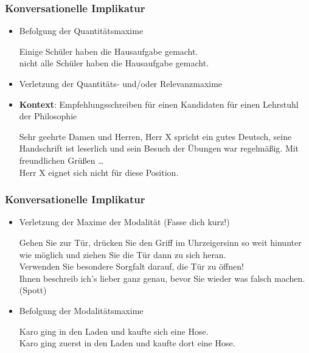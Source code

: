 
\begin{frame}
\frametitle{Konversationelle Implikatur}

\begin{itemize}

	\item Befolgung der Quantitätsmaxime

	\ea Einige Schüler haben die Hausaufgabe gemacht.\\
	\implc nicht alle Schüler haben die Hausaufgabe gemacht.
	\z
	
\medskip
	
	\item Verletzung der Quantitäts- und/oder Relevanzmaxime
	
	\item[] \textbf{Kontext}: Empfehlungsschreiben für einen Kandidaten für einen Lehrstuhl der Philosophie

	\ea Sehr geehrte Damen und Herren, Herr X spricht ein gutes Deutsch, seine Handschrift ist leserlich und sein Besuch der Übungen war regelmä\ss{}ig. Mit freundlichen Grü\ss{}en \dots \\
	\implc Herr X eignet sich nicht für diese Position.
	\z
	
\end{itemize}

\end{frame}



\begin{frame}
\frametitle{Konversationelle Implikatur}

\begin{itemize}
	
	\item Verletzung der Maxime der Modalität (Fasse dich kurz!)
	
	\ea Gehen Sie zur Tür, drücken Sie den Griff im Uhrzeigersinn so weit hinunter wie möglich und ziehen Sie die Tür dann zu sich heran. \\
	\implc Verwenden Sie besondere Sorgfalt darauf, die Tür zu öffnen!\\
	\implc Ihnen beschreib ich's lieber ganz genau, bevor Sie wieder was falsch machen. (Spott)
	\z

\medskip
	
	\item Befolgung der Modalitätsmaxime
	
	\ea Karo ging in den Laden und kaufte sich eine Hose.\\
	\implc Karo ging zuerst in den Laden und kaufte dort eine Hose.
	\z
	
\end{itemize}

\end{frame}


